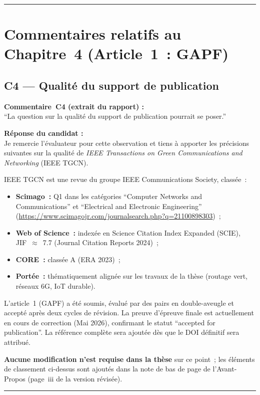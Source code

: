 \documentclass[12pt,a4paper]{article}
\newcommand{\Commentaire}[2]{%
  \begin{reviewerbox}
    \textbf{Commentaire~#1 (extrait du rapport) :}\\#2
  \end{reviewerbox}%
}
\newcommand{\Reponse}[1]{%
  \begin{responsebox}
    \textbf{Réponse du candidat :}\\#1
  \end{responsebox}%
}
\begin{document}
\bigskip
\hrule
\bigskip

\section*{Commentaires relatifs au Chapitre~4 (Article~1~: GAPF)}

\subsection*{C4 --- Qualité du support de publication}

\Commentaire{C4}{
  ``La question sur la qualité du support de publication pourrait se poser.''
}

\Reponse{
Je remercie l'évaluateur pour cette observation et tiens à apporter les précisions suivantes sur la qualité de \emph{IEEE Transactions on Green Communications and Networking} (IEEE TGCN).

IEEE TGCN est une revue du groupe IEEE Communications Society, classée~:
\begin{itemize}[leftmargin=*]
  \item \textbf{Scimago~:} Q1 dans les catégories ``Computer Networks and Communications'' et ``Electrical and Electronic Engineering'' (\url{https://www.scimagojr.com/journalsearch.php?q=21100898303})~;
  \item \textbf{Web of Science~:} indexée en Science Citation Index Expanded (SCIE), JIF~$\approx$~7.7 (Journal Citation Reports 2024)~;
  \item \textbf{CORE~:} classée A (ERA 2023)~;
  \item \textbf{Portée~:} thématiquement alignée sur les travaux de la thèse (routage vert, réseaux 6G, IoT durable).
\end{itemize}

L'article~1 (GAPF) a été soumis, évalué par des pairs en double-aveugle et accepté après deux cycles de révision. La preuve d'épreuve finale est actuellement en cours de correction (Mai 2026), confirmant le statut ``accepted for publication''. La référence complète sera ajoutée dès que le DOI définitif sera attribué.

\textbf{Aucune modification n'est requise dans la thèse} sur ce point~; les éléments de classement ci-dessus sont ajoutés dans la note de bas de page de l'Avant-Propos (page~iii de la version révisée).
}

\bigskip
\hrule
\bigskip
\end{document}
